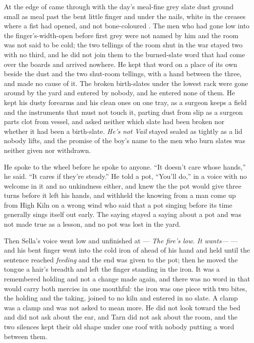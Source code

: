 At the edge of   came through with the day's meal-fine grey slate dust ground small as meal past the bent little finger and under the nails, white in the creases where a fist had opened, and not bone-coloured . The men who had gone low into the finger's-width-open  before first grey were not named by him and the room was not said to be cold; the two tellings of the room shut in the war stayed two with no third, and he did not join them to the burned-slate word that had come over the boards and arrived nowhere. He kept that word on a place of its own beside the dust and the two shut-room tellings, with a hand between the three, and made no cause of it. The broken birth-slates under the lowest rack were gone around by the yard and entered by nobody, and he entered none of them. He kept his dusty forearms and his clean ones on one tray, as a surgeon keeps a field and the instruments that must not touch it, parting dust from slip as a surgeon parts clot from vessel, and asked neither which slate had been broken nor whether it had been a birth-slate. \emph{He's not Vail} stayed sealed as tightly as a lid nobody lifts, and the promise of the boy's name to the men who burn slates was neither given nor withdrawn.

He spoke to the wheel before he spoke to anyone. “It doesn't care whose hands,” he said. “It cares if they're steady.” He told a pot, “You'll do,” in a voice with no welcome in it and no unkindness either, and knew the  the pot would give three turns before it left his hands, and withheld the knowing from a man come up from High Kiln on a wrong wind who said that a pot singing before its time generally sings itself out early. The saying stayed a saying about a pot and was not made true as a lesson, and no pot was lost in the yard.

Then Sella's voice went low and unfinished at  --- \emph{The fire's low. It wants---} --- and his bent finger went into the cold iron of  ahead of his hand and held until the sentence reached \emph{feeding} and the end was given to the pot; then he moved the tongue a hair's breadth and left the finger standing in the iron. It was a remembered holding and not a change made again, and there was no word in  that would carry both mercies in one mouthful: the iron was one piece with two bites, the holding and the taking, joined to no kiln and entered in no slate. A clamp was a clamp and was not asked to mean more. He did not look toward the bed and did not ask about the ear, and Tarn did not ask about the room, and the two silences kept their old shape under one roof with nobody putting a word between them.

